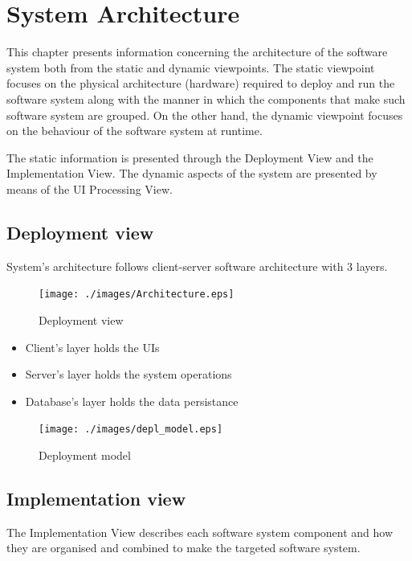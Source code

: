 \chapter{System Architecture}
\label{chap:arch}

This chapter presents information concerning the architecture of the software
system both from the static and dynamic viewpoints. The static viewpoint focuses
on the physical architecture (hardware) required to deploy and run the
software system along with the manner in which the components that make such
software system are grouped. On the other hand, the dynamic viewpoint focuses on
the behaviour of the software system at runtime. 

The static information is presented through the \gls{Deployment View} and the
\gls{Implementation View}. The dynamic aspects of the system are presented by
means of the \gls{UI Processing View}.


\section{Deployment view}
System's architecture follows client-server software architecture with 3 layers.

\begin{figure}
\begin{center}
\texttt{[image: ./images/Architecture.eps]}
\end{center}
\caption{Deployment view}
\end{figure}

\begin{itemize}
  \item Client's layer holds the UIs
  \item Server's layer holds the system operations
  \item Database's layer holds the data persistance
\end{itemize}

\begin{figure}
\begin{center}
\texttt{[image: ./images/depl\_model.eps]}
\end{center}
\caption{Deployment model}
\end{figure}


\section{Implementation view}
The \gls{Implementation View} describes each software system component and how
they are organised and combined to make the targeted software system.



